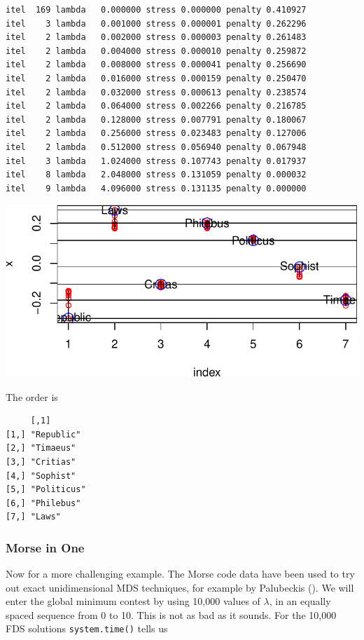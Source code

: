 \documentclass[
  12pt,
  letterpaper,
  DIV=11,
  numbers=noendperiod]{scrreprt}
\theoremstyle{remark}
\begin{document}
\begin{verbatim}
itel  169 lambda   0.000000 stress 0.000000 penalty 0.410927 
itel    3 lambda   0.001000 stress 0.000001 penalty 0.262296 
itel    2 lambda   0.002000 stress 0.000003 penalty 0.261483 
itel    2 lambda   0.004000 stress 0.000010 penalty 0.259872 
itel    2 lambda   0.008000 stress 0.000041 penalty 0.256690 
itel    2 lambda   0.016000 stress 0.000159 penalty 0.250470 
itel    2 lambda   0.032000 stress 0.000613 penalty 0.238574 
itel    2 lambda   0.064000 stress 0.002266 penalty 0.216785 
itel    2 lambda   0.128000 stress 0.007791 penalty 0.180067 
itel    2 lambda   0.256000 stress 0.023483 penalty 0.127006 
itel    2 lambda   0.512000 stress 0.056940 penalty 0.067948 
itel    3 lambda   1.024000 stress 0.107743 penalty 0.017937 
itel    8 lambda   2.048000 stress 0.131059 penalty 0.000032 
itel    9 lambda   4.096000 stress 0.131135 penalty 0.000000 
\end{verbatim}

\begin{center}
\includegraphics{global_files/figure-pdf/plato3-1.pdf}
\end{center}

The order is

\begin{verbatim}
     [,1]       
[1,] "Republic" 
[2,] "Timaeus"  
[3,] "Critias"  
[4,] "Sophist"  
[5,] "Politicus"
[6,] "Philebus" 
[7,] "Laws"     
\end{verbatim}

\subsubsection{Morse in One}\label{morse-in-one}

Now for a more challenging example. The Morse code data have been used
to try out exact unidimensional MDS techniques, for example by
Palubeckis (). We will enter the
global minimum contest by using 10,000 values of \(\lambda\), in an
equally spaced sequence from 0 to 10. This is not as bad as it sounds.
For the 10,000 FDS solutions \texttt{system.time()} tells us
\end{document}
